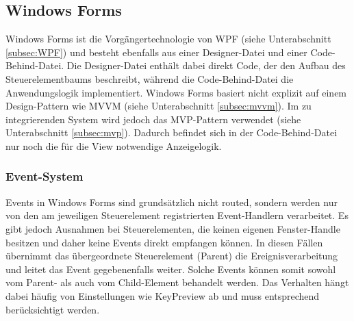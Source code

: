 \subsection{Windows Forms}
\label{subsec:Winforms}
Windows Forms \cite{microsoft_winforms_overview} ist die Vorgängertechnologie von WPF (siehe Unterabschnitt \ref{subsec:WPF}) und besteht ebenfalls aus einer Designer-Datei und einer Code-Behind-Datei. Die Designer-Datei enthält dabei direkt Code, der den Aufbau des Steuerelementbaums beschreibt, während die Code-Behind-Datei die Anwendungslogik implementiert. Windows Forms basiert nicht explizit auf einem Design-Pattern wie MVVM (siehe Unterabschnitt \ref{subsec:mvvm}). Im zu integrierenden System wird jedoch das MVP-Pattern verwendet (siehe Unterabschnitt \ref{subsec:mvp}). Dadurch befindet sich in der Code-Behind-Datei nur noch die für die View notwendige Anzeigelogik.

\subsubsection{Event-System}
Events in Windows Forms \cite{microsoft_winforms_events_overview} sind grundsätzlich nicht routed, sondern werden nur von den am jeweiligen Steuerelement registrierten Event-Handlern verarbeitet. Es gibt jedoch Ausnahmen bei Steuerelementen, die keinen eigenen Fenster-Handle besitzen und daher keine Events direkt empfangen können. In diesen Fällen übernimmt das übergeordnete Steuerelement (Parent) die Ereignisverarbeitung und leitet das Event gegebenenfalls weiter. Solche Events können somit sowohl vom Parent- als auch vom Child-Element behandelt werden. Das Verhalten hängt dabei häufig von Einstellungen wie KeyPreview \cite{microsoft_form_keypreview} ab und muss entsprechend berücksichtigt werden.




